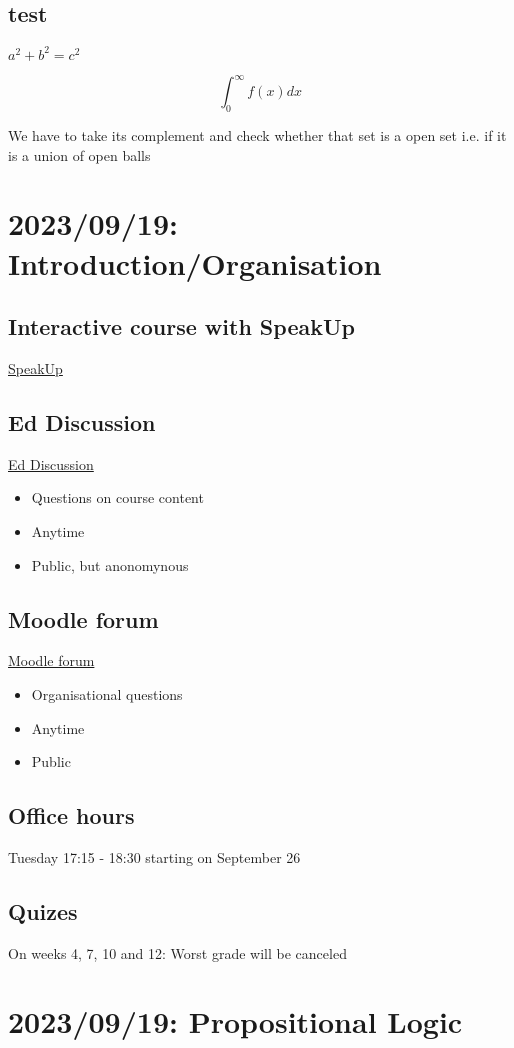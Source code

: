 \subsection{test}

$a^2 + b^2 = c^2$

$$ \int_{0}^{\infty} f(x) dx$$ 

\dfn{}{}
\qs{}{}
\sol We have to take its complement and check whether that set is a open set i.e. if it is a union of open balls
\nt{}
\clm{}{}{}
\ex{}{
}
\thm{}{}
\begin{myproof}
\end{myproof}

\cor{}{}
\mlenma{}{}
\mprop{}{}

\section{2023/09/19: Introduction/Organisation}
\subsection{Interactive course with SpeakUp}
\href{https://go.epfl.ch/speakup-aicc-23}{SpeakUp}
\subsection{Ed Discussion}
\href{https://edstem.org/eu/courses/702/discussion/}{Ed Discussion}
\begin{itemize}
	\item Questions on course content
	\item Anytime
	\item Public, but anonomynous
\end{itemize}
\subsection{Moodle forum}
\href{https://moodle.epfl.ch/mod/forum/view.php?id=1215519}{Moodle forum}
\begin{itemize}
	\item Organisational questions
	\item Anytime
	\item Public
\end{itemize}
\subsection{Office hours}
Tuesday 17:15 - 18:30 starting on September 26
\subsection{Quizes}
On weeks 4, 7, 10 and 12: Worst grade will be canceled
\section{2023/09/19: Propositional Logic}
